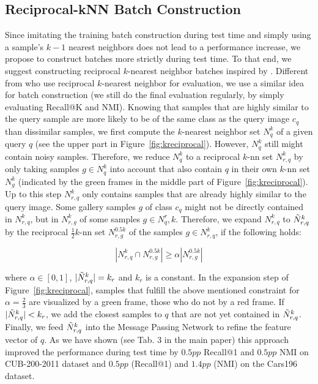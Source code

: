 \documentclass{article}
\begin{document}
\subsection{Reciprocal-kNN Batch Construction}
Since imitating the training batch construction during test time and simply using a sample's $k-1$ nearest neighbors does not lead to a performance increase, we propose to construct batches more strictly during test time. 
To that end, we suggest constructing reciprocal $k$-nearest neighbor batches inspired by \cite{DBLP:conf/cvpr/ZhongZCL17}. Different from \cite{DBLP:conf/cvpr/ZhongZCL17} who use reciprocal $k$-nearest neighbor for evaluation, we use a similar idea for batch construction (we still do the final evaluation regularly, by simply evaluating Recall@K and NMI).
Knowing that samples that are highly similar to the query sample are more likely to be of the same class as the query image $c_q$ than dissimilar samples, we first compute the $k$-nearest neighbor set $N_q^k$ of a given query $q$ (see the upper part in Figure~\ref{fig:kreciprocal}). 
However, $N_q^k$ still might contain noisy samples. Therefore, we reduce $N_q^k$ to a reciprocal $k$-nn set $N_{r, q}^k$ by only taking samples $g \in N_q^k$ into account that also contain $q$ in their own $k$-nn set $N_g^k$ (indicated by the green frames in the middle part of Figure~\ref{fig:kreciprocal}). 
Up to this step $N_{r, q}^k$ only contains samples that are already highly similar to the query image. Some gallery samples $g$ of class $c_q$ might not be directly contained in $N_{r, q}^k$, but in $N_{r, g}^k$ of some samples $g \in N_q^r,k$. Therefore, we expand $N_{r, q}^k$ to $\Tilde{N}_{r, q}^k$ by the reciprocal $\frac{1}{2}k$-nn set $N_{r, g}^{0.5 k}$ of the samples $g \in N_{r, q}^k$, if the following holds:

\begin{equation}
    |N_{r, q}^k \cap N_{r, g}^{0.5 k}| \geq \alpha |N_{r, g}^{0.5 k}|
\end{equation}

where $\alpha \in [0, 1]$, $|\Tilde{N}_{r, q}^k| = k_r$ and $k_r$ is a constant. In the expansion step of Figure~\ref{fig:kreciprocal}, samples that fulfill the above mentioned constraint for $\alpha = \frac{2}{3}$ are visualized by a green frame, those who do not by a red frame. 
If $|\Tilde{N}_{r, q}^k| < k_r$, we add the closest samples to $q$ that are not yet contained in $\Tilde{N}_{r, q}^k$. Finally, we feed $\Tilde{N}_{r, q}^k$ into the Message Passing Network to refine the feature vector of $q$. As we have shown (see Tab. 3 in the main paper) this approach improved the performance during test time by $0.5pp$ Recall@1 and $0.5pp$ NMI on CUB-200-2011 dataset and $0.5pp$ (Recall@1) and $1.4pp$ (NMI) on the Cars196 dataset.
\end{document}

